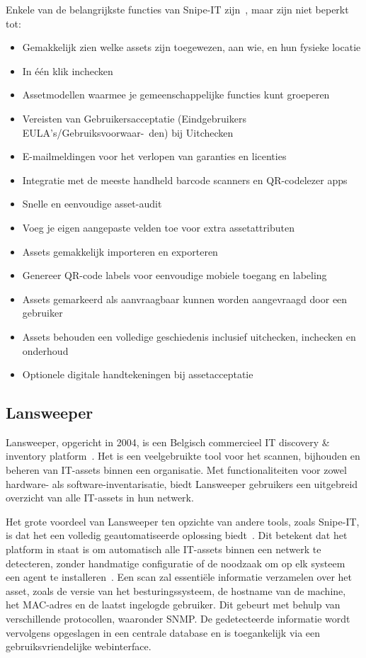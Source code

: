 Enkele van de belangrijkste functies van Snipe-IT zijn~\autocite{snipe-it-features}, maar zijn niet beperkt tot:
\begin{itemize}
    \item Gemakkelijk zien welke assets zijn toegewezen, aan wie, en hun fysieke locatie
    \item In één klik inchecken
    \item Assetmodellen waarmee je gemeenschappelijke functies kunt groeperen
    \item Vereisten van Gebruikersacceptatie (Eindgebruikers EULA's/Gebruiksvoorwaar-\ den) bij Uitchecken
    \item E-mailmeldingen voor het verlopen van garanties en licenties
    \item Integratie met de meeste handheld barcode scanners en QR-codelezer apps
    \item Snelle en eenvoudige asset-audit
    \item Voeg je eigen aangepaste velden toe voor extra assetattributen
    \item Assets gemakkelijk importeren en exporteren
    \item Genereer QR-code labels voor eenvoudige mobiele toegang en labeling
    \item Assets gemarkeerd als aanvraagbaar kunnen worden aangevraagd door een gebruiker
    \item Assets behouden een volledige geschiedenis inclusief uitchecken, inchecken en onderhoud
    \item Optionele digitale handtekeningen bij assetacceptatie
\end{itemize}

\subsection{Lansweeper}
\label{sub:lansweeper}

Lansweeper, opgericht in 2004, is een Belgisch commercieel IT discovery \& inventory platform~\autocite{lansweeper-history}.
Het is een veelgebruikte tool voor het scannen, bijhouden en beheren van IT-assets binnen een organisatie.
Met functionaliteiten voor zowel hardware- als software-inventarisatie, biedt Lansweeper gebruikers een uitgebreid overzicht van alle IT-assets in hun netwerk.

Het grote voordeel van Lansweeper ten opzichte van andere tools, zoals Snipe-IT, is dat het een volledig geautomatiseerde oplossing biedt~\autocite{lansweeper-features}.
Dit betekent dat het platform in staat is om automatisch alle IT-assets binnen een netwerk te detecteren, zonder handmatige configuratie of de noodzaak om op elk systeem een agent te installeren~\autocite{lansweeper-getting-started}.
Een scan zal essenti\"ele informatie verzamelen over het asset, zoals de versie van het besturingssysteem, de hostname van de machine, het MAC-adres en de laatst ingelogde gebruiker.
Dit gebeurt met behulp van verschillende protocollen, waaronder SNMP.
De gedetecteerde informatie wordt vervolgens opgeslagen in een centrale database en is toegankelijk via een gebruiksvriendelijke webinterface.

